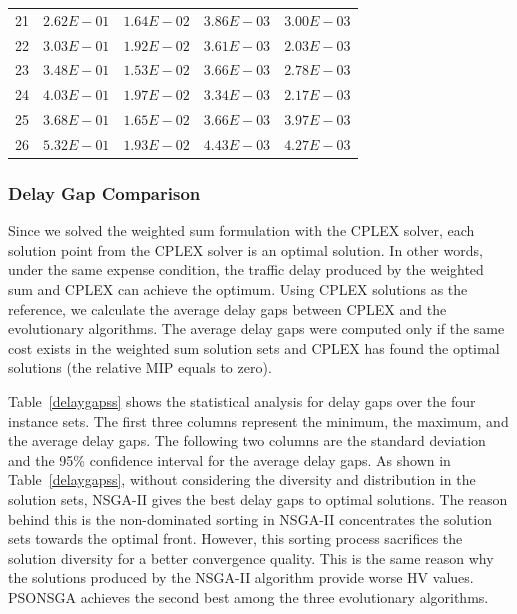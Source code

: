 \documentclass[10pt,journal,compsoc]{IEEEtran}
\begin{document}
\begin{table}[ht]
\begin{scriptsize}
{\begin{tabular}{|*{5}{c|}}
21&$2.62E-01$&$1.64E-02$&$3.86E-03$&\cellcolor{gray95}$3.00E-03$\\
22&$3.03E-01$&$1.92E-02$&$3.61E-03$&\cellcolor{gray95}$2.03E-03$\\
23&$3.48E-01$&$1.53E-02$&$3.66E-03$&\cellcolor{gray95}$2.78E-03$\\
24&$4.03E-01$&$1.97E-02$&$3.34E-03$&\cellcolor{gray95}$2.17E-03$\\
25&$3.68E-01$&$1.65E-02$&\cellcolor{gray95}$3.66E-03$&$3.97E-03$\\
26&$5.32E-01$&$1.93E-02$&$4.43E-03$&\cellcolor{gray95}$4.27E-03$\\\hline
\end{tabular}}
\end{scriptsize}
\end{table}


\subsubsection{Delay Gap Comparison}
Since we solved the weighted sum formulation with the CPLEX solver, each solution point from the CPLEX solver is an optimal solution. In other words, under the same expense condition, the traffic delay produced by the weighted sum and CPLEX can achieve the optimum. Using CPLEX solutions as the reference, we calculate the average delay gaps between CPLEX and the evolutionary algorithms. The average delay gaps were computed only if the same cost exists in the weighted sum solution sets and CPLEX has found the optimal solutions (the relative MIP equals to zero). 

Table~\ref{delaygapss} shows the statistical analysis for delay gaps over the four instance sets. The first three columns represent the minimum, the maximum, and the average delay gaps. The following two columns are the standard deviation and the 95\% confidence interval for the average delay gaps. As shown in Table~\ref{delaygapss}, without considering the diversity and distribution in the solution sets, NSGA-II gives the best delay gaps to optimal solutions. The reason behind this is the non-dominated sorting in NSGA-II concentrates the solution sets towards the optimal front. However, this sorting process sacrifices the solution diversity for a better convergence quality. This is the same reason why the solutions produced by the NSGA-II algorithm provide worse HV values. PSONSGA achieves the second best among the three evolutionary algorithms.
\end{document}
